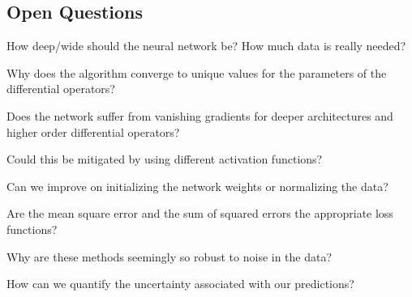 \documentclass[book.tex]{subfiles}
\begin{document}
\subsection{Open Questions}\label{open-questions}

How deep/wide should the neural network be? How much data is really
needed?

Why does the algorithm converge to unique values for the parameters of
the differential operators?

Does the network suffer from vanishing gradients for deeper
architectures and higher order differential operators?

Could this be mitigated by using different activation functions?

Can we improve on initializing the network weights or normalizing the
data?

Are the mean square error and the sum of squared errors the appropriate
loss functions?

Why are these methods seemingly so robust to noise in the data?

How can we quantify the uncertainty associated with our predictions?
\end{document}
